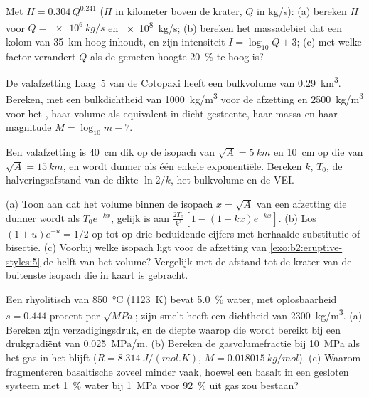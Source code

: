 \begin{exercise}[$\star$]\label{exo:b2:eruptive-styles:3}
Met $H = 0.304\,Q^{0.241}$ ($H$ in kilometer boven de krater, $Q$ in
\unit{kg/s}): (a) bereken $H$ voor $Q = \qty{e6}{kg/s}$ en \qty{e8}{kg/s};
(b) bereken het massadebiet dat een kolom van \qty{35}{km} hoog inhoudt, en zijn
intensiteit $I = \log_{10}Q + 3$; (c) met welke factor verandert $Q$ als de gemeten
hoogte \qty{20}{\percent} te hoog is?
\end{exercise}

\begin{exercise}[$\star$]\label{exo:b2:eruptive-styles:4}
De valafzetting Laag~5 van de Cotopaxi heeft een bulkvolume van \qty{0.29}{km^3}. Bereken, met een
bulkdichtheid van \qty{1000}{kg/m^3} voor de afzetting en \qty{2500}{kg/m^3} voor het
, haar volume als equivalent in dicht gesteente, haar massa en haar magnitude
$M = \log_{10}m - 7$.
\end{exercise}

\begin{exercise}[$\star\star$]\label{exo:b2:eruptive-styles:5}
Een valafzetting is \qty{40}{cm} dik op de isopach van $\sqrt A = \qty{5}{km}$
en \qty{10}{cm} op die van $\sqrt A = \qty{15}{km}$, en wordt dunner als één enkele
exponentiële. Bereken $k$, $T_0$, de halveringsafstand van de dikte $\ln 2/k$, het
bulkvolume en de VEI.
\end{exercise}

\begin{exercise}[$\star\star$]\label{exo:b2:eruptive-styles:6}
(a) Toon aan dat het volume binnen de isopach $x = \sqrt A$ van een afzetting die dunner wordt
als $T_0e^{-kx}$, gelijk is aan $\frac{2T_0}{k^2}[1 - (1 + kx)e^{-kx}]$. (b) Los $(1 + u)e^{-u} =
1/2$ op tot op drie beduidende cijfers met herhaalde substitutie of bisectie. (c) Voorbij welke isopach ligt
voor de afzetting van \cref{exo:b2:eruptive-styles:5} de helft van het volume? Vergelijk
met de afstand tot de krater van de buitenste isopach die in kaart is gebracht.
\end{exercise}

\begin{exercise}[$\star\star$]\label{exo:b2:eruptive-styles:7}
Een rhyolitisch  van \qty{850}{\celsius} (\qty{1123}{K}) bevat
\qty{5.0}{\percent} water, met oplosbaarheid $s = 0.444$ procent per
$\sqrt{\unit{MPa}}$; zijn smelt heeft een dichtheid van \qty{2300}{kg/m^3}. (a) Bereken zijn
verzadigingsdruk, en de diepte waarop die wordt bereikt bij een drukgradiënt
van \qty{0.025}{MPa/m}. (b) Bereken de gasvolumefractie bij
\qty{10}{MPa} als het gas in het  blijft ($R = \qty{8.314}{J/(mol.K)}$, $M =
\qty{0.018015}{kg/mol}$). (c) Waarom fragmenteren basaltische  zoveel minder
vaak, hoewel een basalt in een gesloten systeem met \qty{1}{\percent} water bij \qty{1}{MPa}
voor \qty{92}{\percent} uit gas zou bestaan?
\end{exercise}

